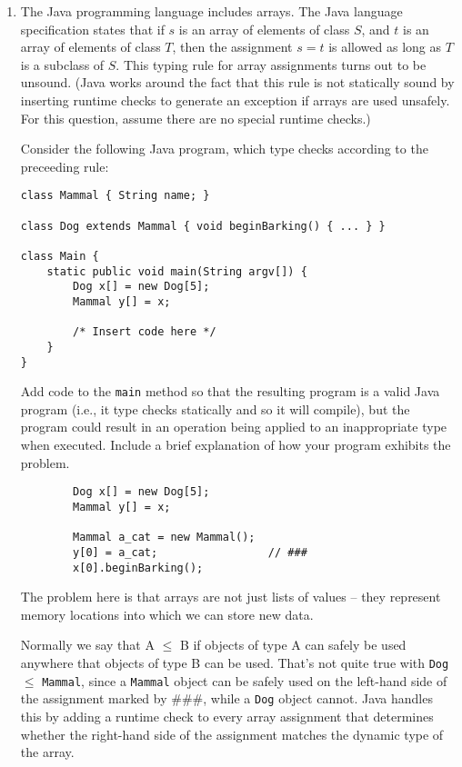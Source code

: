 \documentclass{article}
\begin{document}
\begin{enumerate}
{ %


}


\item The Java programming language includes arrays.  The Java
language specification states that if $s$ is an array of elements of
class $S$, and $t$ is an array of elements of class $T$, then the
assignment $s = t$ is allowed as long as $T$ is a subclass of $S$.
This typing rule for array assignments turns out to be unsound. (Java
works around the fact that this rule is not statically sound by inserting
runtime checks to generate an exception if arrays are used
unsafely. For this question, assume there are no special runtime checks.)

Consider the following Java program, which type checks according
to the preceeding rule:
\begin{verbatim}
class Mammal { String name; }

class Dog extends Mammal { void beginBarking() { ... } }

class Main {
    static public void main(String argv[]) {
        Dog x[] = new Dog[5];
        Mammal y[] = x;

        /* Insert code here */
    }
}
\end{verbatim}
Add code to the \texttt{main} method so that the resulting program is
a valid Java program (i.e., it type checks statically and so it will
compile), but the program could result in an operation being applied
to an inappropriate type when executed.  Include a brief explanation
of how your program exhibits the problem.

\begin{verbatim}
        Dog x[] = new Dog[5];
        Mammal y[] = x;

        Mammal a_cat = new Mammal();
        y[0] = a_cat;                 // ###
        x[0].beginBarking();
\end{verbatim}

The problem here is that arrays are not just lists of values -- they
represent memory locations into which we can store new data. 

Normally we say that A $\leq$ B if objects of type A can safely be
used anywhere that objects of type B can be used.  That's not quite
true with {\tt Dog\lbrack\rbrack} $\leq$ {\tt Mammal\lbrack\rbrack}, since a
{\tt Mammal\lbrack\rbrack} object can be safely used on the left-hand side
of the assignment marked by \#\#\#, while a {\tt Dog\lbrack\rbrack} object
cannot.  Java handles this by adding a runtime check to every array
assignment that determines whether the right-hand side of the
assignment matches the dynamic type of the array.

\end{enumerate}
\end{document}
